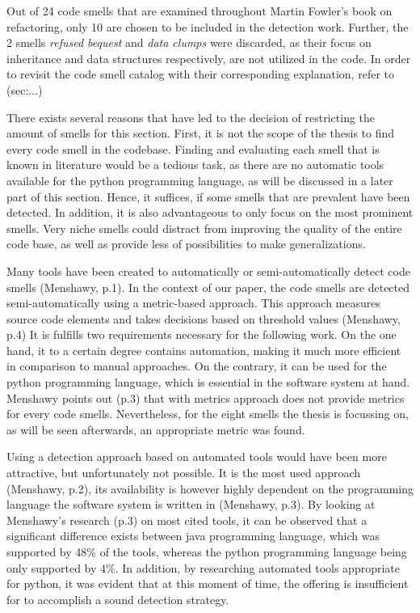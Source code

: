 Out of 24 code smells that are examined throughout Martin Fowler's book on refactoring, only 10 are chosen to be included in the detection work. Further, the 2 smells \emph{refused bequest} and \emph{data clumps} were discarded, as their focus on inheritance and data structures respectively, are not utilized in the code. In order to revisit the code smell catalog with their corresponding explanation, refer to (sec:...)
 

There exists several reasons that have led to the decision of restricting the amount of smells for this section. First, it is not the scope of the thesis to find every code smell in the codebase. Finding and evaluating each smell that is known in literature would be a tedious task, as there are no automatic tools available for the python programming language, as will be discussed in a later part of this section. Hence, it suffices, if some smells that are prevalent have been detected. In addition, it is also advantageous to only focus on the most prominent smells. Very niche smells could distract from improving the quality of the entire code base, as well as provide less of possibilities to make generalizations.

Many tools have been created to automatically or semi-automatically detect code smells (Menshawy, p.1). In the context of our paper, the code smells are detected semi-automatically using a metric-based approach. This approach measures source code elements and takes decisions based on threshold values (Menshawy, p.4) It is fulfills two requirements necessary for the following work. On the one hand, it to a certain degree contains automation, making it much more efficient in comparison to manual approaches. On the contrary, it can be used for the python programming language, which is essential in the software system at hand. Menshawy points out (p.3) that with metrics approach does not provide metrics for every code smells. Nevertheless, for the eight smells the thesis is focussing on, as will be seen afterwards, an appropriate metric was found.

Using a detection approach based on automated tools would have been more attractive, but unfortunately not possible.  It is the most used approach (Menshawy, p.2), its availability is however highly dependent on the programming language the software system is written in (Menshawy, p.3). By looking at Menshawy's research (p.3) on most cited tools, it can be observed that a significant difference exists between java programming language, which was supported  by 48\% of the tools, whereas the python programming language being only supported by 4\%.
In addition, by researching automated tools appropriate for python, it was evident that at this moment of time, the offering is insufficient for to accomplish a sound detection strategy. 

